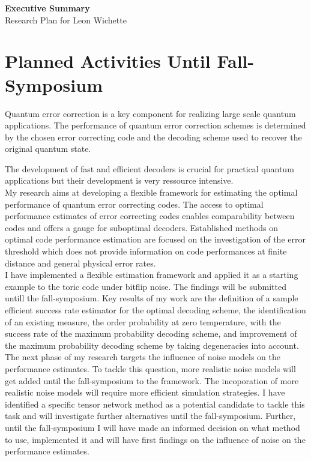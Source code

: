 \documentclass[11pt,a4paper]{article}
\begin{document}
\begin{center}
    \LARGE \textbf{Executive Summary} \\
    \large Research Plan for Leon Wichette\\
    \normalsize\vspace{0.5cm}
\end{center}
\vspace{-0.5cm}
\section*{Planned Activities Until Fall-Symposium}
Quantum error correction is a key component for realizing large scale quantum applications.
The performance of quantum error correction schemes is determined by the chosen error correcting code and the decoding scheme used to recover the original quantum state.

The development of fast and efficient decoders is crucial for practical quantum applications but their development is very ressource intensive.\\
My research aims at developing a flexible framework for estimating the optimal performance of quantum error correcting codes.
The access to optimal performance estimates of error correcting codes enables comparability between codes and offers a gauge for suboptimal decoders.
Established methods on optimal code performance estimation are focused on the investigation of the error threshold which does not provide information on code performances at finite distance and general physical error rates.\\
I have implemented a flexible estimation framework and applied it as a starting example to the toric code under bitflip noise. The findings will be submitted untill the fall-symposium.
Key results of my work are the definition of a sample efficient success rate estimator for the optimal decoding scheme, the identification of an existing measure, the order probability at zero temperature, with the success rate of the maximum probability decoding scheme, and improvement of the maximum probability decoding scheme by taking degeneracies into account.\\
The next phase of my research targets the influence of noise models on the performance estimates. To tackle this question, more realistic noise models will get added until the fall-symposium to the framework.
The incoporation of more realistic noise models will require more efficient simulation strategies. I have identified a specific tensor network method as a potential candidate to tackle this task and will investigate further alternatives until the fall-symposium.
Further, until the fall-symposium I will have made an informed decision on what method to use, implemented it and will have first findings on the influence of noise on the performance estimates.
\end{document}
